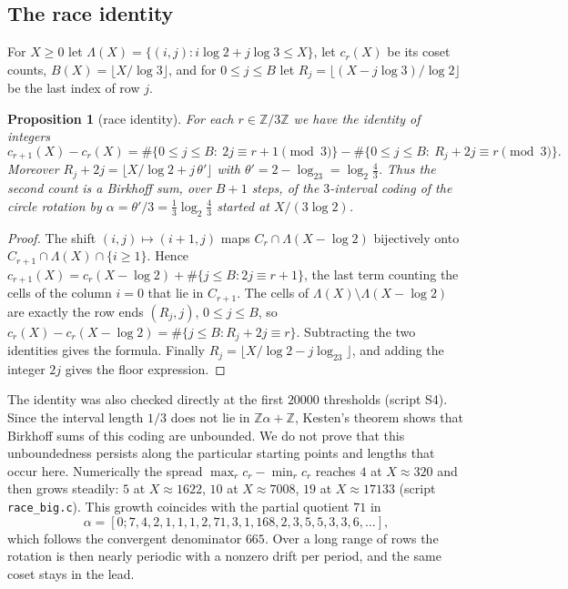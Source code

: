 \documentclass[11pt]{amsart}
\newtheorem{proposition}[theorem]{Proposition}
\theoremstyle{definition}
\newcommand{\Z}{\mathbb{Z}}
\begin{document}
\subsection{The race identity}
For $X\ge0$ let $\Lambda(X)=\{(i,j):i\log2+j\log3\le X\}$, let $c_r(X)$ be its coset counts, $B(X)=\lfloor X/\log3\rfloor$, and for $0\le j\le B$ let $R_j=\lfloor (X-j\log 3)/\log 2\rfloor$ be the last index of row $j$.

\begin{proposition}[race identity]\label{prop:race}
For each $r\in\Z/3\Z$ we have the identity of integers
\[
c_{r+1}(X)-c_r(X)=\#\{0\le j\le B:\ 2j\equiv r+1 \!\!\pmod 3\}-\#\{0\le j\le B:\ R_j+2j\equiv r\!\!\pmod 3\}.
\]
Moreover $R_j+2j=\lfloor X/\log 2+j\,\theta'\rfloor$ with $\theta'=2-\log_23=\log_2\frac43$. Thus the second count is a Birkhoff sum, over $B+1$ steps, of the $3$-interval coding of the circle rotation by $\alpha=\theta'/3=\frac13\log_2\frac43$ started at $X/(3\log 2)$.
\end{proposition}

\begin{proof}
The shift $(i,j)\mapsto(i+1,j)$ maps $C_r\cap\Lambda(X-\log2)$ bijectively onto $C_{r+1}\cap\Lambda(X)\cap\{i\ge1\}$. Hence $c_{r+1}(X)=c_r(X-\log2)+\#\{j\le B:2j\equiv r+1\}$, the last term counting the cells of the column $i=0$ that lie in $C_{r+1}$. The cells of $\Lambda(X)\setminus\Lambda(X-\log2)$ are exactly the row ends $(R_j,j)$, $0\le j\le B$, so $c_r(X)-c_r(X-\log2)=\#\{j\le B:R_j+2j\equiv r\}$. Subtracting the two identities gives the formula. Finally $R_j=\lfloor X/\log2-j\log_23\rfloor$, and adding the integer $2j$ gives the floor expression.
\end{proof}

The identity was also checked directly at the first $20000$ thresholds (script S4). Since the interval length $1/3$ does not lie in $\Z\alpha+\Z$, Kesten's theorem \cite{Kesten} shows that Birkhoff sums of this coding are unbounded. We do not prove that this unboundedness persists along the particular starting points and lengths that occur here. Numerically the spread $\max_rc_r-\min_rc_r$ reaches $4$ at $X\approx320$ and then grows steadily: $5$ at $X\approx1622$, $10$ at $X\approx7008$, $19$ at $X\approx17133$ (script \texttt{race\_big.c}). This growth coincides with the partial quotient $71$ in
\[
\alpha=[0;7,4,2,1,1,1,2,71,3,1,168,2,3,5,5,3,3,6,\dots],
\]
which follows the convergent denominator $665$. Over a long range of rows the rotation is then nearly periodic with a nonzero drift per period, and the same coset stays in the lead.
\end{document}
